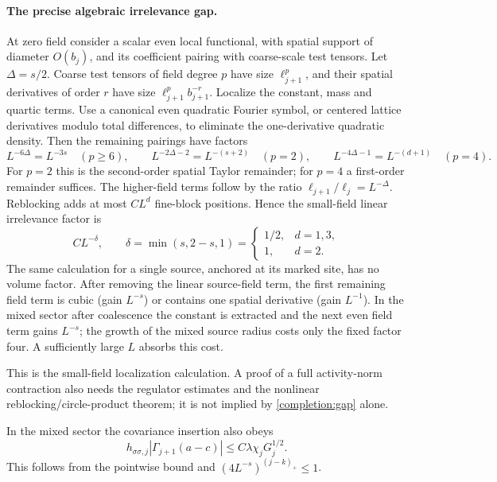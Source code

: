 \documentclass[11pt]{article}
\begin{document}
\paragraph{The precise algebraic irrelevance gap.}
At zero field consider a scalar even local functional, with spatial
support of diameter \(O(b_j)\), and its coefficient pairing with
coarse-scale test tensors. Let \(\Delta=s/2\). Coarse test tensors of
field degree \(p\) have size \(\ell_{j+1}^p\), and their spatial
derivatives of order \(r\) have size
\(\ell_{j+1}^p b_{j+1}^{-r}\). Localize the constant, mass and quartic
terms. Use a canonical even quadratic Fourier symbol, or centered
lattice derivatives modulo total differences, to eliminate the
one-derivative quadratic density. Then the remaining pairings have
factors
\[
 L^{-6\Delta}=L^{-3s}\quad(p\ge6),\qquad
 L^{-2\Delta-2}=L^{-(s+2)}\quad(p=2),\qquad
 L^{-4\Delta-1}=L^{-(d+1)}\quad(p=4).
\]
For \(p=2\) this is the second-order spatial Taylor remainder; for
\(p=4\) a first-order remainder suffices. The higher-field terms follow
by the ratio \(\ell_{j+1}/\ell_j=L^{-\Delta}\). Reblocking adds at most
\(CL^d\) fine-block positions. Hence the small-field linear
irrelevance factor is
\begin{equation}\label{completion:gap}
 CL^{-\delta},\qquad
 \delta=\min(s,2-s,1)=
 \begin{cases}1/2,&d=1,3,\\1,&d=2.\end{cases}
\end{equation}
The same calculation for a single source, anchored at its marked site,
has no volume factor. After removing the linear source-field term,
the first remaining field term is cubic (gain \(L^{-s}\)) or contains
one spatial derivative (gain \(L^{-1}\)). In the mixed sector after
coalescence the constant is extracted and the next even field term
gains \(L^{-s}\); the growth of the mixed source radius costs only the
fixed factor four. A sufficiently large \(L\) absorbs this cost.

This is the small-field localization calculation. A proof of a full
activity-norm contraction also needs the regulator estimates and the
nonlinear reblocking/circle-product theorem; it is not implied by
\eqref{completion:gap} alone.

In the mixed sector the covariance insertion also obeys
\[
 h_{\sigma\sigma,j}|\Gamma_{j+1}(a-c)|
       \le C\lambda\chi_jG_j^{1/2}.
\]
This follows from the pointwise bound and
\((4L^{-s})^{(j-k)_+}\le1\).
\end{document}
